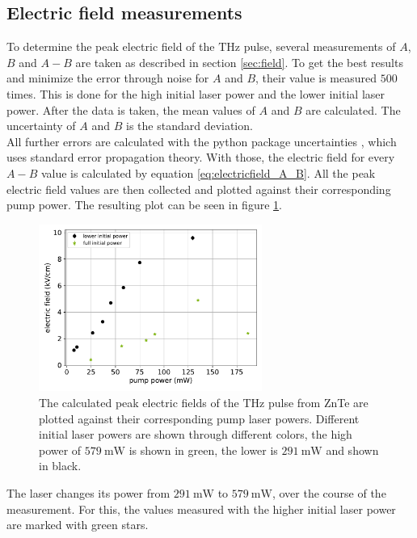 \subsection{Electric field measurements}
\label{sec:znte_electricfield}
To determine the peak electric field of the $\si{\tera\hertz}$ pulse, several measurements of $A$, $B$ and $A-B$ are taken as described in section \ref{sec:field}.
To get the best results and minimize the error through noise for $A$ and $B$, their value is measured $500$ times.
This is done for the high initial laser power and the lower initial laser power.
After the data is taken, the mean values of $A$ and $B$ are calculated.
The uncertainty of $A$ and $B$ is the standard deviation.
\\
All further errors are calculated with the python package uncertainties \cite{uncertainties}, which uses standard error propagation theory.
With those, the electric field for every $A-B$ value is calculated by equation \eqref{eq:electricfield_A_B}.
All the peak electric field values are then collected and plotted against their corresponding pump power.
The resulting plot can be seen in figure \ref{fig:znte_electricfield}.\FloatBarrier
\begin{figure}
    \centering
    \includegraphics[width=0.65\textwidth]{Plots/eltric_field_ZnTe.pdf}
    \caption{The calculated peak electric fields of the $\si{\tera\hertz}$ pulse from ZnTe are plotted against their corresponding pump laser powers.
    Different initial laser powers are shown through different colors, the high power of $\SI{579}{\milli\W}$ is shown in green, the lower is $\SI{291}{\milli\W}$ and shown in black.}
    \label{fig:znte_electricfield}
\end{figure}\FloatBarrier
The laser changes its power from $\SI{291}{\milli\W}$ to $\SI{579}{\milli\W}$, over the course of the measurement. 
For this, the values measured with the higher initial laser power are marked with green stars.
